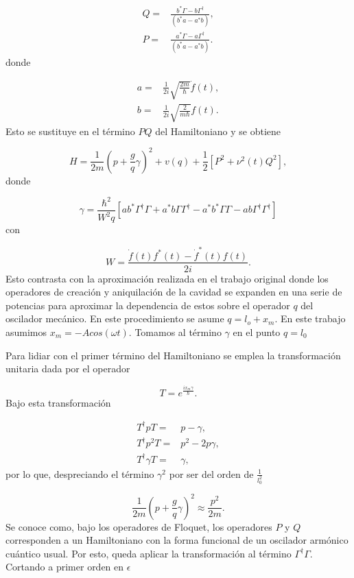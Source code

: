 \documentclass[10pt,a4paper]{report}
\begin{document}
\begin{align}
Q =& \frac{b^* \Gamma - b \Gamma^\dagger}{(b^* a - a^*b)},\\
P =& \frac{a^* \Gamma - a \Gamma^\dagger}{(b^* a - a^*b)}.
\end{align} donde

\begin{align}
a =& \frac{1}{2i}\sqrt{\frac{2m}{\hbar}} \dot{f}(t),\\
b =& \frac{1}{2i}\sqrt{\frac{2}{m\hbar}} f(t).
\end{align} Esto se sustituye en el término $PQ$ del Hamiltoniano y se obtiene

\begin{equation}
H = \frac{1}{2m}(p + \frac{g}{q} \gamma)^2 + v(q) + \frac{1}{2}[P^2+\nu^2 (t)Q^2],
\end{equation} donde

\begin{equation}
\gamma = \frac{\hbar^2}{W^2 q}[ab^*\Gamma^\dagger \Gamma + a^*b \Gamma \Gamma^\dagger - a^*b^* \Gamma \Gamma - ab \Gamma^\dagger \Gamma^\dagger]
\end{equation} con

\begin{equation}
W= \frac{\dot{f}(t)f^*(t)-\dot{f}^*(t)f(t)}{2i}.
\end{equation}  Esto contrasta con la aproximación realizada en el trabajo original donde los operadores de creación y aniquilación de la cavidad se expanden en una serie de potencias para aproximar la dependencia de estos sobre el operador $q$ del oscilador mecánico. En este procedimiento se asume $q = l_o + x_m$. En este trabajo asumimos $x_m = -Acos(\omega t)$. Tomamos al término $\gamma$ en el punto $q=l_0$

Para lidiar con el primer término del Hamiltoniano se emplea la transformación unitaria dada por el operador

\begin{equation}
T = e^\frac{i x_m \gamma}{\hbar}.
\end{equation} Bajo esta transformación 

\begin{align*}
T^\dagger p T =& p - \gamma, \\
T^\dagger p^2 T =& p^2 -2p\gamma, \\
T^\dagger \gamma T =& \gamma,
\end{align*} por lo que, despreciando el término $\gamma^2$ por ser del orden de $\frac{1}{l_0^2}$

\begin{equation}
\frac{1}{2m}(p + \frac{g}{q} \gamma)^2 \approx \frac{p^2}{2m}.
\end{equation} Se conoce como, bajo los operadores de Floquet, los operadores $P$ y $Q$ corresponden a un Hamiltoniano con la forma funcional de un oscilador armónico cuántico usual. Por esto, queda aplicar la transformación al término $\Gamma^\dagger \Gamma$. Cortando a primer orden en $\epsilon$
\end{document}
